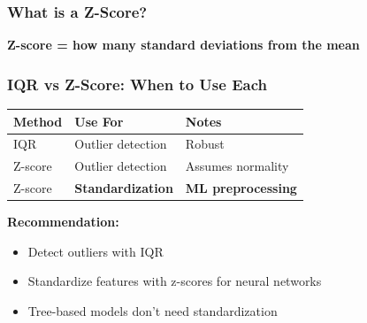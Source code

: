 \documentclass[notes]{beamer}
\begin{document}
\begin{frame}
\frametitle{What is a Z-Score?}

\textbf{Z-score = how many standard deviations from the mean}


\end{frame}

\begin{frame}
\frametitle{IQR vs Z-Score: When to Use Each}

\begin{center}
\begin{tabular}{lll}
\toprule
\textbf{Method} & \textbf{Use For} & \textbf{Notes} \\
\midrule
IQR & Outlier detection & Robust \\
Z-score & Outlier detection & Assumes normality \\
Z-score & \textbf{Standardization} & \textbf{ML preprocessing} \\
\bottomrule
\end{tabular}
\end{center}

\vspace{1em}

\textbf{Recommendation:}
\begin{itemize}
\item Detect outliers with IQR
\item Standardize features with z-scores for neural networks
\item Tree-based models don't need standardization
\end{itemize}

\end{frame}
\end{document}
